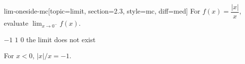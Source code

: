 \begin{problem}{lim-oneside-mc}[topic=limit, section=2.3, style=mc, diff=med]
	For $f(x) = \dfrac{|x|}{x}$, evaluate $\displaystyle \lim_{x \to 0^-} f(x)$.
	\begin{choices}
		\cchoice $-1$
		\choice $1$
		\choice $0$
		\choice the limit does not exist
	\end{choices}
	\begin{solution} For $x < 0$, $|x|/x = -1$. \end{solution}
\end{problem}
